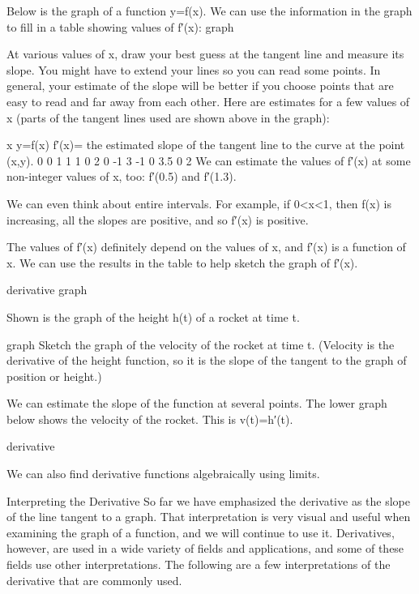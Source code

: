 \begin{example}
Below is the graph of a function y=f(x). We can use the information in the graph to fill in a table showing values of f′(x):
graph

\begin{solution} At various values of x, draw your best guess at the tangent line and measure its slope. You might have to extend your lines so you can read some points. In general, your estimate of the slope will be better if you choose points that are easy to read and far away from each other. Here are estimates for a few values of x (parts of the tangent lines used are shown above in the graph):

x	y=f(x)	f′(x)= the estimated slope of the tangent line to the curve at the point (x,y).	0	0	1	1	1	0	2	0	-1	3	-1	0	3.5	0	2
We can estimate the values of f′(x) at some non-integer values of x, too: f′(0.5) and f′(1.3).

We can even think about entire intervals. For example, if 0<x<1, then f(x) is increasing, all the slopes are positive, and so f′(x) is positive.

The values of f′(x) definitely depend on the values of x, and f′(x) is a function of x. We can use the results in the table to help sketch the graph of f′(x).

derivative graph
\end{solution}\end{example}
\begin{example}
Shown is the graph of the height h(t) of a rocket at time t.

graph
Sketch the graph of the velocity of the rocket at time t. (Velocity is the derivative of the height function, so it is the slope of the tangent to the graph of position or height.)

\begin{solution} We can estimate the slope of the function at several points. The lower graph below shows the velocity of the rocket. This is v(t)=h′(t).

derivative
\end{solution}\end{example}
We can also find derivative functions algebraically using limits.



Interpreting the Derivative
So far we have emphasized the derivative as the slope of the line tangent to a graph. That interpretation is very visual and useful when examining the graph of a function, and we will continue to use it. Derivatives, however, are used in a wide variety of fields and applications, and some of these fields use other interpretations. The following are a few interpretations of the derivative that are commonly used.

